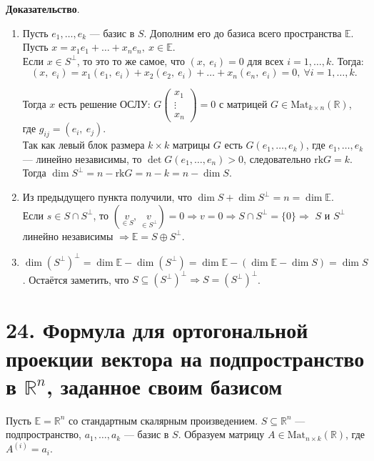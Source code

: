 \documentclass[a4paper, 12pt]{article}
\newcommand{\E}{\mathbb{E}}
\newcommand{\R}{\mathbb{R}}
\newcommand{\Mat}{\text{Mat}}
\newcommand{\rk}{\text{rk}}
\begin{document}
\textbf{Доказательство}.
\vspace{-3mm}
\begin{enumerate}
\itemsep=0em
\item Пусть $e_1, \ldots, e_k$ --- базис в $S$. Дополним его до базиса всего пространства $\E$. \\
Пусть $x = x_1e_1 + \ldots + x_ne_n,\ x \in \E$. \\
Если $x \in S^\bot$, то это то же самое, что $(x,\ e_i) = 0$ для всех $i = 1, \ldots, k$. Тогда:
\vspace{-3mm}
\[
(x,\ e_i) = x_1(e_1,\ e_i) + x_2(e_2,\ e_i) + \ldots + x_n(e_n,\ e_i) = 0,\ \forall i = 1, \ldots, k.
\]

\vspace{-3mm}
Тогда $x$ есть решение ОСЛУ: $G\begin{pmatrix} x_1 \\ \vdots \\ x_n \end{pmatrix} = 0$ с матрицей $G \in \Mat_{k \times n}(\R)$, где $g_{ij} = (e_i,\ e_j)$. \\
Так как левый блок размера $k \times k$ матрицы $G$ есть $G(e_1, \ldots, e_k)$, где $e_1, \ldots, e_k$ --- линейно независимы, то $\det G(e_1, \ldots, e_n) > 0$, следовательно $\rk G = k$. Тогда $\dim S^\bot = n - \rk G = n - k = n - \dim S$.
\item Из предыдущего пункта получили, что $\dim S + \dim S^\bot = n = \dim\E$. \\
Если $s \in S \cap S^\bot$, то $(\underset{\in S}{v},\ \underset{\in S^\bot}{v}) = 0 \Longrightarrow v = 0 \Longrightarrow S \cap S^\bot = \{0\} \Longrightarrow$ $S$ и $S^\bot$ линейно независимы $\Longrightarrow \E = S \oplus S^\bot$.
\item $\dim (S^\bot)^\bot = \dim\E - \dim(S^\bot) = \dim\E- (\dim\E - \dim S) = \dim S$. Остаётся заметить, что $S \subseteq (S^\bot)^\bot \Longrightarrow S = (S^\bot)^\bot$.
\end{enumerate}

\section*{24. Формула для ортогональной проекции вектора на подпространство в $\R^n$, заданное своим базисом}
Пусть $\E = \R^n$ со стандартным скалярным произведением. $S \subseteq \R^n$ --- подпространство, $a_1, \ldots, a_k$ --- базис в $S$. Образуем матрицу $A \in \Mat_{n \times k}(\R)$, где $A^{(i)} = a_i$.
\end{document}
